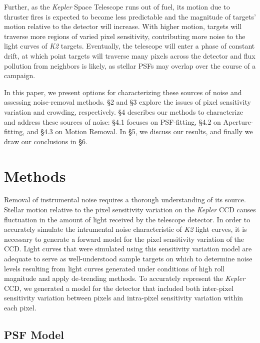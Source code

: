 \documentclass[12pt,preprint]{aastex}
\begin{document}
Further, as the \textit{Kepler} Space Telescope runs out of fuel, its motion due to thruster fires is expected to become less predictable and the magnitude of targets' motion relative to the detector will increase. With higher motion, targets will traverse more regions of varied pixel sensitivity, contributing more noise to the light curves of \textit{K2} targets. Eventually, the telescope will enter a phase of constant drift, at which point targets will traverse many pixels across the detector and flux pollution from neighbors is likely, as stellar PSFs may overlap over the course of a campaign.

In this paper, we present options for characterizing these sources of noise and assessing noise-removal methods. \S 2 and \S 3 explore the issues of pixel sensitivity variation and crowding, respectively. \S 4 describes our methods to characterize and address these sources of noise: \S 4.1 focuses on PSF-fitting, \S 4.2 on Aperture-fitting, and \S 4.3 on Motion Removal. In \S 5, we discuss our results, and finally we draw our conclusions in \S 6.

\section{Methods}

Removal of instrumental noise requires a thorough understanding of its source. Stellar motion relative to the pixel sensitivity variation on the \textit{Kepler} CCD causes fluctuation in the amount of light received by the telescope detector. In order to accurately simulate the intrumental noise characteristic of \textit{K2} light curves, it is necessary to generate a forward model for the pixel sensitivity variation of the CCD. Light curves that were simulated using this sensitivity variation model are adequate to serve as well-understood sample targets on which to determine noise levels resulting from light curves generated under conditions of high roll magnitude and apply de-trending methods. To accurately represent the \textit{Kepler} CCD, we generated a model for the detector that included both inter-pixel sensitivity variation between pixels and intra-pixel sensitivity variation within each pixel.

\subsection{PSF Model}
\end{document}
